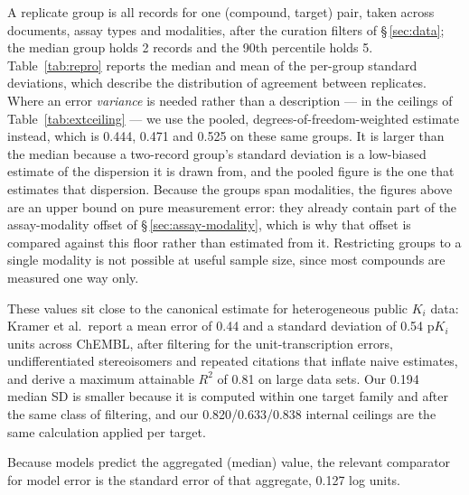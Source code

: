 \documentclass[11pt,a4paper]{article}
\begin{document}
A replicate group is all records for one (compound, target) pair, taken across documents,
assay types and modalities, after the curation filters of \S\,\ref{sec:data}; the median
group holds 2 records and the 90th percentile holds 5. Table~\ref{tab:repro} reports the
median and mean of the per-group standard deviations, which describe the distribution of
agreement between replicates. Where an error \emph{variance} is needed rather than a
description --- in the ceilings of Table~\ref{tab:extceiling} --- we use the pooled,
degrees-of-freedom-weighted estimate instead, which is 0.444, 0.471 and 0.525 on these
same groups. It is larger than the median because a two-record group's standard deviation
is a low-biased estimate of the dispersion it is drawn from, and the pooled figure is the
one that estimates that dispersion. Because the groups span modalities,
the figures above are an upper bound on pure measurement error: they already contain part
of the assay-modality offset of \S\,\ref{sec:assay-modality}, which is why that offset is
compared against this floor rather than estimated from it. Restricting groups to a single
modality is not possible at useful sample size, since most compounds are measured one way
only.

These values sit close to the canonical estimate for heterogeneous public $K_i$ data:
Kramer et al.\ report a mean error of 0.44 and a standard deviation of 0.54 p$K_i$ units
across ChEMBL, after filtering for the unit-transcription errors, undifferentiated
stereoisomers and repeated citations that inflate naive estimates, and derive a maximum
attainable $R^2$ of 0.81 on large data sets.\cite{Kramer2012} Our 0.194 median SD is
smaller because it is computed within one target family and after the same class of
filtering, and our 0.820/0.633/0.838 internal ceilings are the same calculation applied
per target.

Because models predict the aggregated (median) value, the relevant comparator for model
error is the standard error of that aggregate, 0.127 log units.
\end{document}
